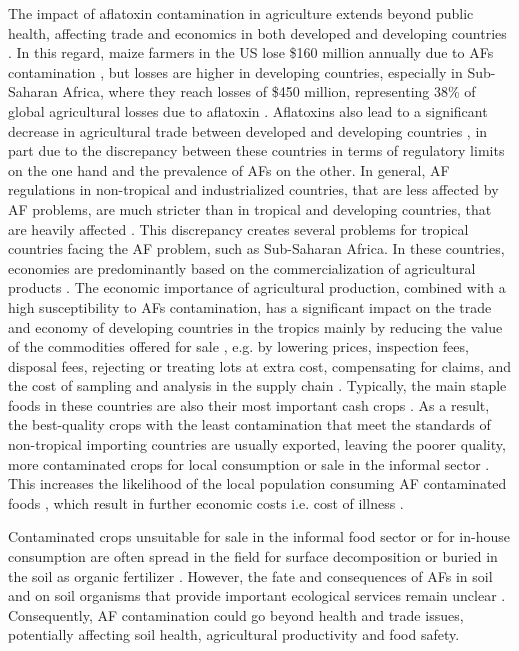 The impact of aflatoxin contamination in agriculture extends beyond public health, affecting trade and economics in both developed and developing countries \citep{jallow2021worldwide}. In this regard, maize farmers in the US lose \$160 million annually due to AFs contamination \citep{wu2015global}, but losses are higher in developing countries, especially in Sub-Saharan Africa, where they reach losses of \$450 million, representing 38\% of global agricultural losses due to aflatoxin \citep{gbashi2018socio}. Aflatoxins also lead to a significant decrease in agricultural trade between developed and developing countries \citep{wu2015global}, in part due to the discrepancy between these countries in terms of regulatory limits on the one hand and the prevalence of AFs on the other. In general, AF regulations in non-tropical and industrialized countries, that are less affected by AF problems, are much stricter than in tropical and developing countries, that are heavily affected \citep{sirma2018impacts}. This discrepancy creates several problems for tropical countries facing the AF problem, such as Sub-Saharan Africa. In these countries, economies are predominantly based on the commercialization of agricultural products \citep{matumba2015concentrating}. The economic importance of agricultural production, combined with a high susceptibility to AFs contamination, has a significant impact on the trade and economy of developing countries in the tropics mainly by reducing the value of the commodities offered for sale \citep{jallow2021worldwide}, e.g. by lowering prices, inspection fees, disposal fees, rejecting or treating lots at extra cost, compensating for claims, and the cost of sampling and analysis in the supply chain \citep{gbashi2018socio}. Typically, the main staple foods in these countries are also their most important cash crops \citep{nji2022six}. As a result, the best-quality crops with the least contamination that meet the standards of non-tropical importing countries are usually exported, leaving the poorer quality, more contaminated crops for local consumption or sale in the informal sector \citep{matumba2015concentrating, nji2022six}. This increases the likelihood of the local population consuming AF contaminated foods \citep{udomkun2017mycotoxins, nji2022six}, which result in further economic costs i.e. cost of illness \citep{meijer2021aflatoxin}.


Contaminated crops unsuitable for sale in the informal food sector or for in-house consumption are often spread in the field for surface decomposition or buried in the soil as organic fertilizer \citep{fouche2020aflatoxins}. However, the fate and consequences of AFs in soil and on soil organisms that provide important ecological services remain unclear \citep{fouche2020aflatoxins}. Consequently, AF contamination could go beyond health and trade issues,  potentially affecting soil health, agricultural productivity and food safety.

